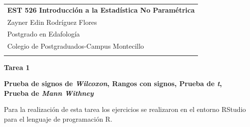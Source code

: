 \documentclass[a4paper,12pt]{article} %
\begin{document}
		

		\thispagestyle{empty} %
		
		\begin{tabular}{p{15.5cm}} %
			{\large \bf EST 526 Introducción a la Estadística No Paramétrica} \\
			Zayner Edin Rodríguez Flores \\ Postgrado en Edafología  \\ Colegio de Postgraduados-Campus Montecillo\\
			\hline %
			\\
		\end{tabular} %
		
		\vspace*{0.3cm} %
		
		\begin{center} %
			{\Large \bf Tarea 1} %
			\vspace{2mm}
			
			{\bf Prueba de signos de \textit{Wilcoxon}, Rangos con signos, Prueba de \textit{t}, Prueba de \textit{Mann Withney} } %
			
		\end{center}  
\vspace{0.4 cm}

		Para la realización de esta tarea los ejercicios se realizaron en el entorno RStudio para el lenguaje de programación R.
\end{document}
